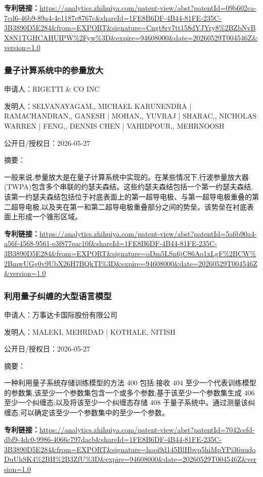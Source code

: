 \documentclass[12pt,a4paper]{ctexart}
\begin{document}
\noindent\textbf{专利链接：}\url{https://analytics.zhihuiya.com/patent-view/abst?patentId=09b602ca-7cd6-46b9-89a4-4e1187e8767c&shareId=1FE8B6DF-4B44-81FE-235C-3B3890D5E284&from=EXPORT&signature=Cngt8rv7tt158dYJYry8%2BZbNvBX8N1TGHCAHUIPW%2Fyw%3D&expire=94608000&date=20260529T004546Z&version=1.0 }

\subsubsection{ 量子计算系统中的参量放大 }

申请人：RIGETTI \& CO INC

发明人：SELVANAYAGAM,, MICHAEL KARUNENDRA | RAMACHANDRAN,, GANESH | MOHAN,, YUVRAJ | SHARAC,, NICHOLAS WARREN | FENG,, DENNIS CHEN | VAHIDPOUR,, MEHRNOOSH

公开日/授权日：2026-05-27

摘要：

一般来说,参量放大是在量子计算系统中实现的。在某些情况下,行波参量放大器(TWPA)包含多个串联的约瑟夫森结。这些约瑟夫森结包括一个第一约瑟夫森结,该第一约瑟夫森结包括位于衬底表面上的第一超导电极、与第一超导电极重叠的第二超导电极,以及夹在第一和第二超导电极重叠部分之间的势垒。该势垒在衬底表面上形成一个锥形区域。

\noindent\textbf{专利链接：}\url{https://analytics.zhihuiya.com/patent-view/abst?patentId=5a6b90a4-a56f-4568-9561-e3f877eac10f&shareId=1FE8B6DF-4B44-81FE-235C-3B3890D5E284&from=EXPORT&signature=oDm5LSn6jC86Ao1xLgF%2BCW%2BmwUGg0v9UbX26H7BQkTI%3D&expire=94608000&date=20260529T004546Z&version=1.0 }

\subsubsection{ 利用量子纠缠的大型语言模型 }

申请人：万事达卡国际股份有限公司

发明人：MALEKI, MEHRDAD | KOTHALE, NITISH

公开日/授权日：2026-05-27

摘要：

一种利用量子系统存储训练模型的方法 400 包括:接收 404 至少一个代表训练模型的参数集,该至少一个参数集包含一个或多个参数;基于该至少一个参数集生成 406 至少一个纠缠态;以及将该至少一个纠缠态存储 408 于量子系统中。通过测量该纠缠态,可以确定该至少一个参数集中的至少一个参数。

\noindent\textbf{专利链接：}\url{https://analytics.zhihuiya.com/patent-view/abst?patentId=7042cefd-dbf9-4dc0-9986-4066c797dacb&shareId=1FE8B6DF-4B44-81FE-235C-3B3890D5E284&from=EXPORT&signature=hooi9d145BlHbvp5hiMpYPi36uudoDuUhSK4%2BH%2B3ZfU%3D&expire=94608000&date=20260529T004546Z&version=1.0 }
\end{document}
